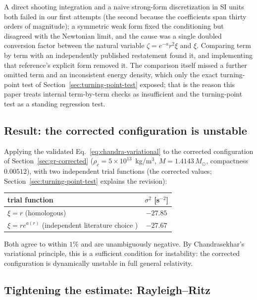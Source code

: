 \documentclass[11pt]{article}
\begin{document}
A direct shooting integration and a naive strong-form discretization in SI units both failed in our first attempts (the second because the coefficients span thirty orders of magnitude); a symmetric weak form fixed the conditioning but disagreed with the Newtonian limit, and the cause was a single doubled conversion factor between the natural variable $\zeta=e^{-a}r^2\xi$ and $\xi$. Comparing term by term with an independently published restatement \citep{Haemmerle2025} found it, and implementing that reference's explicit form removed it. The comparison itself missed a further omitted term and an inconsistent energy density, which only the exact turning-point test of Section~\ref{sec:turning-point-test} exposed; that is the reason this paper treats internal term-by-term checks as insufficient and the turning-point test as a standing regression test.

\subsection{Result: the corrected configuration is unstable}
\label{sec:gr-result}

Applying the validated Eq.~\eqref{eq:chandra-variational} to the corrected configuration of Section~\ref{sec:gr-corrected} ($\rho_c=5\times10^{13}$~kg/m$^3$, $M=1.4143\,M_\odot$, compactness $0.00512$), with two independent trial functions (the corrected values; Section~\ref{sec:turning-point-test} explains the revision):

\begin{center}
\begin{tabular}{lc}
\hline
trial function & $\sigma^2$ [s$^{-2}$] \\
\hline
$\xi=r$ (homologous) & $-27.85$ \\
$\xi=re^{a(r)}$ (independent literature choice \citep{Haemmerle2025}) & $-27.67$ \\
\hline
\end{tabular}
\end{center}

Both agree to within $1\%$ and are unambiguously negative. By Chandrasekhar's variational principle, this is a sufficient condition for instability: the corrected configuration is dynamically unstable in full general relativity.

\subsection{Tightening the estimate: Rayleigh--Ritz}
\label{sec:rayleigh-ritz}
\end{document}

